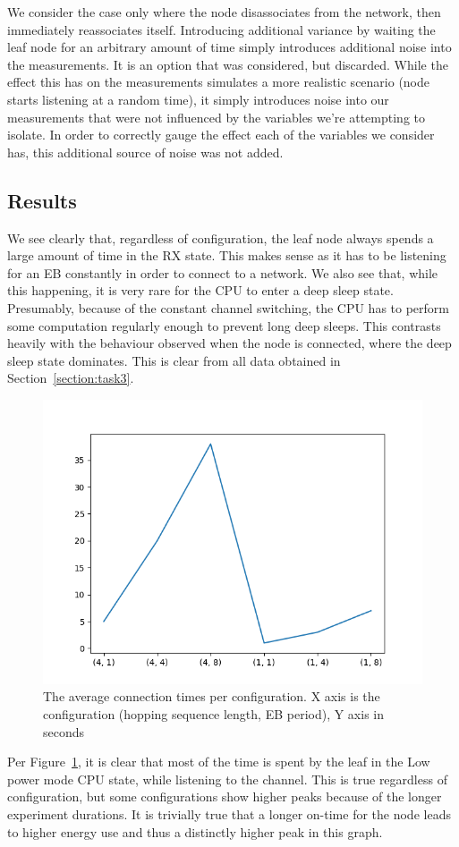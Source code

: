 \documentclass[conference]{IEEEtran}
\newcommand{\figref}[1]{Figure~\ref{#1}}
\newcommand{\secref}[1]{Section~\ref{#1}}
\renewcommand\_{\textunderscore\allowbreak}
\begin{document}
We consider the case only where the node disassociates from the network, then immediately reassociates itself. Introducing additional variance by waiting the leaf node for an arbitrary amount of time simply introduces additional noise into the measurements. It is an option that was considered, but discarded. While the effect this has on the measurements simulates a more realistic scenario (node starts listening at a random time), it simply introduces noise into our measurements that were not influenced by the variables we're attempting to isolate. In order to correctly gauge the effect each of the variables we consider has, this additional source of noise was not added.


\subsection{Results}

We see clearly that, regardless of configuration, the leaf node always spends a large amount of time in the RX state. This makes sense as it has to be listening for an EB constantly in order to connect to a network. We also see that, while this happening, it is very rare for the CPU to enter a deep sleep state. Presumably, because of the constant channel switching, the CPU has to perform some computation regularly enough to prevent long deep sleeps. This contrasts heavily with the behaviour observed when the node is connected, where the deep sleep state dominates. This is clear from all data obtained in \secref{section:task3}.



\begin{figure}[htbp]
	\centering
	\includegraphics[width=.48\textwidth,keepaspectratio]{figures/times}
	\caption{The average connection times per configuration. X axis is the configuration (hopping sequence length, EB period), Y axis in seconds}
	\label{fig:t2leaf}
\end{figure}

Per \figref{fig:t2leaf}, it is clear that most of the time is spent by the leaf in the Low power mode CPU state, while listening to the channel. This is true regardless of configuration, but some configurations show higher peaks because of the longer experiment durations. It is trivially true that a longer on-time for the node leads to higher energy use and thus a distinctly higher peak in this graph. 
\end{document}
